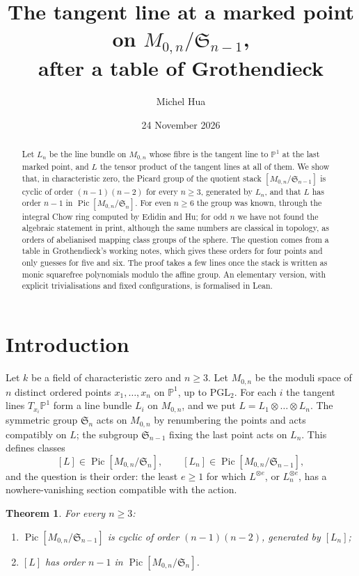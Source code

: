 \documentclass[11pt,a4paper]{amsart}
\title[The tangent line at a marked point]{The tangent line at a marked point on $M_{0,n}/\mathfrak S_{n-1}$,\\ after a table of Grothendieck}
\author{Michel Hua}
\date{24 November 2026}
\newtheorem{theorem}{Theorem}
\theoremstyle{remark}
\newcommand{\M}{M_{0,n}}
\newcommand{\Sn}{\mathfrak S}
\newcommand{\Pic}{\operatorname{Pic}}
\newcommand{\PP}{\mathbb P^1}
\begin{document}
\begin{abstract}
Let $L_n$ be the line bundle on $M_{0,n}$ whose fibre is the tangent line to $\mathbb P^1$ at the last marked point, and $L$ the tensor product of the tangent lines at all of them. We show that, in characteristic zero, the Picard group of the quotient stack $[M_{0,n}/\mathfrak S_{n-1}]$ is cyclic of order $(n-1)(n-2)$ for every $n \ge 3$, generated by $L_n$, and that $L$ has order $n-1$ in $\operatorname{Pic}[M_{0,n}/\mathfrak S_n]$. For even $n \ge 6$ the group was known, through the integral Chow ring computed by Edidin and Hu; for odd $n$ we have not found the algebraic statement in print, although the same numbers are classical in topology, as orders of abelianised mapping class groups of the sphere. The question comes from a table in Grothendieck's working notes, which gives these orders for four points and only guesses for five and six. The proof takes a few lines once the stack is written as monic squarefree polynomials modulo the affine group. An elementary version, with explicit trivialisations and fixed configurations, is formalised in Lean.
\end{abstract}

\maketitle

\section{Introduction}

Let $k$ be a field of characteristic zero and $n \ge 3$. Let $\M$ be the moduli space of $n$ distinct ordered points $x_1, \dots, x_n$ on $\PP$, up to $\mathrm{PGL}_2$. For each $i$ the tangent lines $T_{x_i}\PP$ form a line bundle $L_i$ on $\M$, and we put $L = L_1 \otimes \dots \otimes L_n$. The symmetric group $\Sn_n$ acts on $\M$ by renumbering the points and acts compatibly on $L$; the subgroup $\Sn_{n-1}$ fixing the last point acts on $L_n$. This defines classes
\[
[L] \in \Pic[\M/\Sn_n], \qquad [L_n] \in \Pic[\M/\Sn_{n-1}],
\]
and the question is their order: the least $e \ge 1$ for which $L^{\otimes e}$, or $L_n^{\otimes e}$, has a nowhere-vanishing section compatible with the action.

\begin{theorem}\label{thm:main}
For every $n \ge 3$:
\begin{enumerate}
\item $\Pic[\M/\Sn_{n-1}]$ is cyclic of order $(n-1)(n-2)$, generated by $[L_n]$;
\item $[L]$ has order $n-1$ in $\Pic[\M/\Sn_n]$.
\end{enumerate}
\end{theorem}
\end{document}
